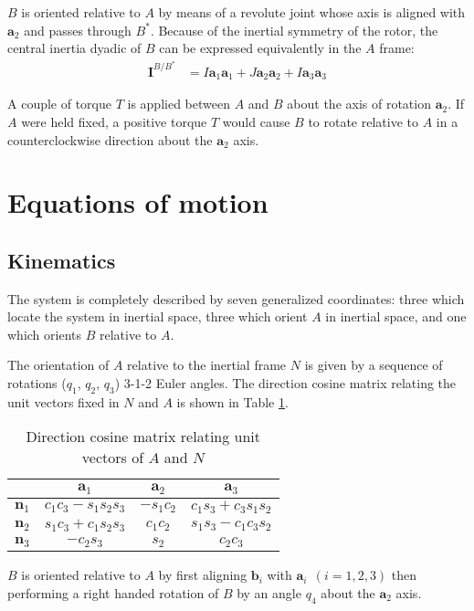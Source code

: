 \documentclass[letterpaper,11pt]{article}
\newcommand{\bs}[1]{ \boldsymbol{ #1 } }
\begin{document}
$B$ is oriented relative to $A$ by means of a revolute joint whose axis is
aligned with $\bs{a}_2$ and passes through $B^*$.  Because of the inertial
symmetry of the rotor, the central inertia dyadic of $B$ can be expressed
equivalently in the $A$ frame:
\begin{align*}
  \bs{I}^{B/B^*} & = I\bs{a}_1\bs{a}_1 + J\bs{a}_2\bs{a}_2 + I\bs{a}_3\bs{a}_3
\end{align*}

A couple of torque $T$ is applied between $A$ and $B$ about the axis of
rotation $\bs{a}_2$.  If $A$ were held fixed, a positive torque $T$ would cause
$B$ to rotate relative to $A$ in a counterclockwise direction about the
$\bs{a}_2$ axis.

\section*{Equations of motion}
\subsection*{Kinematics}

The system is completely described by seven generalized coordinates: three
which locate the system in inertial space, three which orient $A$ in inertial
space, and one which orients $B$ relative to $A$.

The orientation of $A$ relative to the inertial frame $N$ is given by a
sequence of rotations ($q_1$, $q_2$, $q_3$) 3-1-2 Euler angles.  The direction
cosine matrix relating the unit vectors fixed in $N$ and $A$ is shown in Table
\ref{directioncosines}.

\begin{table}[!h]
  \begin{center}
    \begin{tabular}{l|ccc}
      & $\bs{a}_1$ & $\bs{a}_2$ & $\bs{a}_3$ \\
      \hline
      $\bs{n}_1$ & $c_1c_3 - s_1s_2s_3$ & $-s_1c_2$ & $c_1s_3 + c_3s_1s_2$ \\
      $\bs{n}_2$ & $s_1c_3 + c_1s_2s_3$ & $ c_1c_2$& $s_1s_3 - c_1c_3s_2$ \\
      $\bs{n}_3$ & $-c_2s_3$ & $s_2$& $c_2c_3$
    \end{tabular}
  \end{center}
  \caption{Direction cosine matrix relating unit vectors of $A$ and $N$}
  \label{directioncosines}
\end{table}

$B$ is oriented relative to $A$ by first aligning $\bs{b}_i$ with $\bs{a}_i
\:\: (i = 1,2,3)$ then performing a right handed rotation of $B$ by an angle
$q_4$ about the $\bs{a}_2$ axis.
\end{document}

